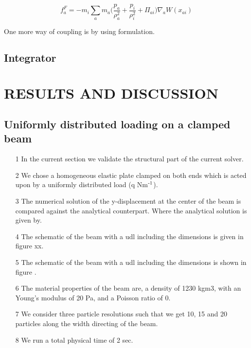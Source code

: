 \documentclass[10pt, conference]{FMFP2022}
\begin{document}
\begin{equation}
  f_a^F = -m_i \sum_{a} m_a \bigg(\frac{p_a}{\rho_{a}^2} +
  \frac{p_i}{\rho_{i}^2} + \Pi_{ai} \bigg) \nabla_{a} W(x_{ai})
\end{equation}


One more way of coupling is by using \cite{khayyer2018enhanced} formulation.


\subsection{\textbf{Integrator}}\label{subsec:integrator}


\section{\textbf{RESULTS AND DISCUSSION}}\label{sec3}

\subsection{Uniformly distributed loading on a clamped beam}
\label{sec:udl}

\begin{itemize}
\item [1] In the current section we validate the structural part of the current solver.
\item [2] We chose a homogeneous elastic plate clamped on both ends which is
  acted upon by a uniformly distributed load (q Nm$\textsuperscript{-1}$).
\item [3] The numerical solution of the y-displacement at the center of the beam
  is compared against the analytical counterpart. Where the analytical solution
  is given by.
\item [4] The schematic of the beam with a udl including the dimensions is
given in figure xx.
\item [5] The schematic of the beam with a udl including the dimensions is
shown in figure .
\item [6] The material properties of the beam are, a density of 1230 kgm3, with
  an Young's modulus of 20 Pa, and a Poisson ratio of 0.
\item [7] We consider three particle resolutions such that we get 10, 15 and 20
  particles along the width directing of the beam.
\item [8] We run a total physical time of 2 sec.
\end{itemize}
\end{document}
